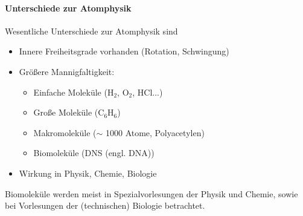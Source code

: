     \paragraph{Unterschiede zur Atomphysik} Wesentliche Unterschiede zur Atomphysik sind
    \begin{itemize}
    	\item Innere Freiheitsgrade vorhanden (Rotation, Schwingung)
    	\item Größere Mannigfaltigkeit: 
    		\begin{itemize}
    			\item Einfache Moleküle ($\text{H}_{2}$, $\text{O}_{2}$, $\text{HCl}$...)
    			\item Große Moleküle ($\text{C}_{6}\text{H}_{6}$)
    			\item Makromoleküle ($\sim $ 1000 Atome, Polyacetylen)
    			\item Biomoleküle (DNS (engl. DNA))
    		\end{itemize}
    	\item Wirkung in Physik, Chemie, Biologie
    \end{itemize}
    \begin{verbal}
        Biomoleküle werden meist in Spezialvorlesungen der Physik und Chemie, sowie bei Vorlesungen der (technischen) Biologie betrachtet.
    \end{verbal}
    
